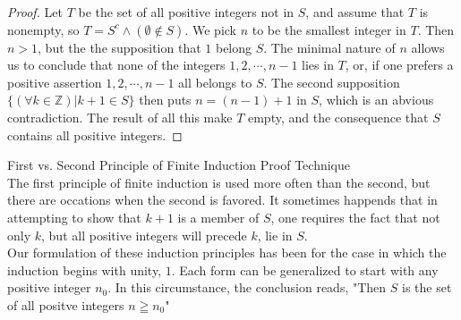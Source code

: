 \begin{definition}
\begin{proof}
    Let $T$ be the set of all positive integers not in $S$, and assume that $T$ is nonempty, so $T = S^c \wedge (\emptyset \notin S)$. We pick $n$ to be the smallest integer in $T$. Then $n>1$, but the the supposition that $1$ belong $S$. The minimal nature of $n$ allows us to conclude that none of the integers $1, 2, \cdots, n-1$ lies in $T$, or, if one prefers a positive assertion $1, 2, \cdots, n-1$ all belongs to $S$. The second supposition $\{ (\forall k \in \mathbb{Z}) | k+1 \in S \}$ then puts $n=(n-1)+1$ in $S$, which is an abvious contradiction. The result of all this make $T$ empty, and the consequence that $S$ contains all positive integers. 
  
\end{proof}
\end{definition}

\begin{definition}
First vs. Second Principle of Finite Induction Proof Technique \\

The first principle of finite induction is used more often than the second, but there are occations when the second is favored. It sometimes happends that in attempting to show that $k+1$ is a member of $S$, one requires the fact that not only $k$, but all positive integers will precede $k$, lie in $S$. \\

Our formulation of these induction principles has been for the case in which the induction begins with unity, $1$. Each form can be generalized to start with any positive integer $n_0$. In this circumstance, the conclusion reads, "Then $S$ is the set of all positve integers $n \geqq n_0$" \\

\end{definition}


